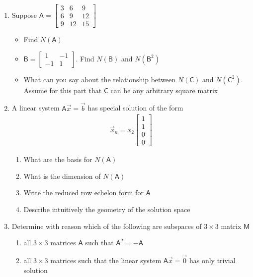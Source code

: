 \documentclass[a4paper, 11pt]{article}
\newcommand{\mat}[1]{\boldsymbol { \mathsf{#1}} }
\begin{document}
\begin{enumerate}
\item Suppose $\mat A = \begin{bmatrix} 
    3 & 6 & 9 \\ 
    6 & 9 & 12 \\
    9 & 12 & 15 \end{bmatrix}$
    \begin{itemize}
      \item Find $N(\mat A)$
      \item $\mat B = \begin{bmatrix} 1 & -1 \\ -1 & 1 \end{bmatrix}$. Find $N(\mat B)$ and $N(\mat B^2)$
      \item What can you say about the relationship between $N(\mat C)$ and $N(\mat C^2)$. Assume for this part that $\mat C$ can be any arbitrary square matrix
    \end{itemize}
    
\item A linear system $\mat A \vec x = \vec b$ has special solution of the form
\begin{align}
 \vec x_n = x_2 \begin{bmatrix} 1 \\ 1 \\ 0 \\ 0 \end{bmatrix}
 \end{align} 
\begin{enumerate}[label=(\alph*)]
\item What are the basis for $N(\mat A)$
\item What is the dimension of $N(\mat A)$
\item Write the reduced row echelon form for $\mat A$
\item Describe intuitively the geometry of the solution space
\end{enumerate}

\item Determine with reason which of the following are subspaces of $3 \times 3$ matrix $\mat M$
\begin{enumerate}[label=(\alph*)]
\item all $3 \times 3$ matrices $\mat A$ such that $\mat A^T = -\mat A$
\item all $3 \times 3$ matrices such that the linear system $\mat A \vec x = \vec 0$ has only trivial solution
\end{enumerate}




\end{enumerate}
\end{document}
